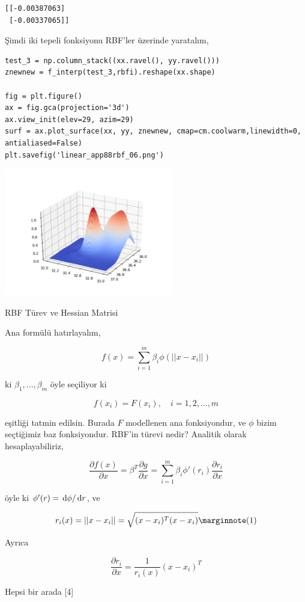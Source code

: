 \documentclass[12pt,fleqn]{article}\usepackage{../../common}
\begin{document}
\begin{verbatim}
[[-0.00387063]
 [-0.00337065]]
\end{verbatim}

Şimdi iki tepeli fonksiyonu RBF'ler üzerinde yaratalım,

\begin{verbatim}
test_3 = np.column_stack((xx.ravel(), yy.ravel()))
znewnew = f_interp(test_3,rbfi).reshape(xx.shape)

fig = plt.figure()
ax = fig.gca(projection='3d')
ax.view_init(elev=29, azim=29)
surf = ax.plot_surface(xx, yy, znewnew, cmap=cm.coolwarm,linewidth=0, antialiased=False)
plt.savefig('linear_app88rbf_06.png')
\end{verbatim}

\includegraphics[width=20em]{linear_app88rbf_06.png}

RBF Türev ve Hessian Matrisi

Ana formülü hatırlayalım, 

$$
f(x) = \sum_{i=1}^{m} \beta_i \phi(|| x-x_i||)
$$

ki $\beta_1,...,\beta_m$ öyle seçiliyor ki 

$$
f(x_i) = F(x_i), \quad i=1,2,...,m
$$

eşitliği tatmin edilsin. Burada $F$ modellenen ana fonksiyondur, ve $\phi$
bizim seçtiğimiz baz fonksiyondur. RBF'in türevi nedir? Analitik olarak
hesaplayabiliriz,

$$
\frac{\partial f(x)}{\partial x} = \beta^T \frac{\partial g}{\partial x} =
\sum_{i=1}^{m} \beta_i \phi'(r_i) \frac{\partial r_i}{\partial x} 
$$

öyle ki $\phi'(r) = \,\mathrm{d} \phi / \,\mathrm{d} r$, ve 

$$
r_i(x) = ||x-x_i|| = \sqrt{(x-x_i)^T(x-x_i)} 
\mlabel{1}
$$

Ayrıca

$$
\frac{\partial r_i}{\partial x} = \frac{1}{r_i(x)} (x-x_i)^T
$$

Hepsi bir arada [4]
\end{document}
